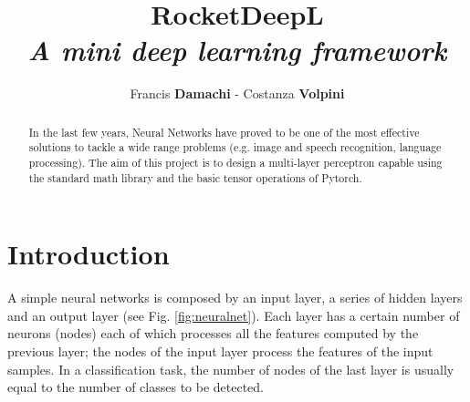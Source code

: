 \documentclass[journal, a4paper]{IEEEtran}
\begin{document}
	\title{RocketDeepL \\ \textit{\Large{A mini deep learning framework}}}
	\author{Francis \textbf{Damachi} - Costanza \textbf{Volpini}}
	\maketitle
	
\begin{abstract}
In the last few years, Neural Networks have proved to be one of the most effective solutions to tackle a wide range problems (e.g. image and speech recognition, language processing). The aim of this project is to design a multi-layer perceptron capable using the standard math library and the basic tensor operations of Pytorch.
\end{abstract}

\section{Introduction}
\label{sec:intro}
A simple neural networks is composed by an input layer, a series of hidden layers and an output layer (see Fig. \ref{fig:neuralnet}). Each layer has a certain number of neurons (nodes) each of which processes all the features computed by the previous layer; the nodes of the input layer process the features of the input samples. In a classification task, the number of nodes of the last layer is usually equal to the number of classes to be detected.
\end{document}
